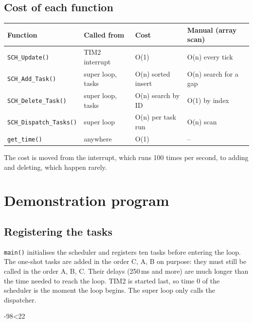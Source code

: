 \documentclass[12pt,a4paper]{article}
\numberwithin{figure}{section}
\numberwithin{table}{section}
\newcommand{\srcbody}[4]{}
\newcommand{\src}[4]{\par\ifnum\numexpr#3-#2\relax<22 \noindent\begin{minipage}{\linewidth}\srcbody{#1}{#2}{#3}{#4}\end{minipage}\else\srcbody{#1}{#2}{#3}{#4}\fi\par}
\newcommand{\code}[1]{\texttt{#1}}
\newcommand{\report}[1]{\subsection*{#1}}
\begin{document}
\subsection{Cost of each function}
\begin{center}\small
\begin{tabular}{llll}
\toprule
\textbf{Function} & \textbf{Called from} & \textbf{Cost} & \textbf{Manual (array scan)}\\
\midrule
\code{SCH\_Update()} & TIM2 interrupt & O(1) & O(n) every tick\\
\code{SCH\_Add\_Task()} & super loop, tasks & O(n) sorted insert & O(n) search for a gap\\
\code{SCH\_Delete\_Task()} & super loop, tasks & O(n) search by ID & O(1) by index\\
\code{SCH\_Dispatch\_Tasks()} & super loop & O(n) per task run & O(n) scan\\
\code{get\_time()} & anywhere & O(1) & --\\
\bottomrule
\end{tabular}
\end{center}
The cost is moved from the interrupt, which runs 100 times per second, to adding and deleting, which happen rarely.

\section{Demonstration program}
\label{sec:app}
\report{Registering the tasks}
\code{main()} initialises the scheduler and registers ten tasks before entering the loop. The one-shot tasks are added in the order C, A, B on purpose: they must still be called in the order A, B, C. Their delays (250\,ms and more) are much longer than the time needed to reach the loop. TIM2 is started last, so time 0 of the scheduler is the moment the loop begins. The super loop only calls the dispatcher.
\src{main.c}{98}{136}{Task registration and the super loop}
\end{document}
